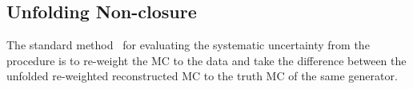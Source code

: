 %
%
%
%

\subsection{Unfolding Non-closure}
\label{sec:gbb-systs:unfolding}

The standard method~\cite{Armbruster:1694351} for evaluating the systematic uncertainty from the procedure is to re-weight the MC to the data and take the difference between the unfolded re-weighted reconstructed MC to the truth MC of the same generator.

